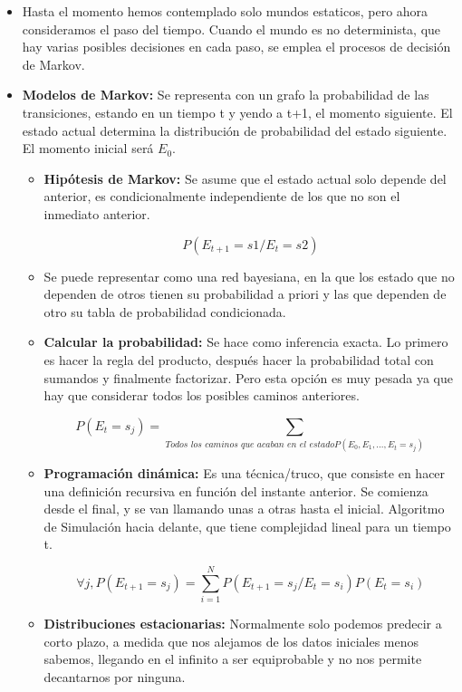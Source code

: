 \documentclass[12pt, twoside, openright]{report} %
\begin{document}
  
  \begin{itemize}
  \item Hasta el momento hemos contemplado solo mundos estaticos, pero ahora
    consideramos el paso del tiempo. Cuando el mundo es no determinista,
    que hay varias posibles decisiones en cada paso, se emplea el
    procesos de decisión de Markov.
    
  \item \textbf{Modelos de Markov:} Se representa con un grafo la
    probabilidad de las transiciones, estando en un tiempo t y yendo a
    t+1, el momento siguiente. El estado actual determina la
    distribución de probabilidad del estado siguiente. El momento
    inicial será $E_0$.
    

    \begin{itemize}
    \item \textbf{Hipótesis de Markov:} Se asume que el estado actual solo
      depende del anterior, es condicionalmente independiente de los que
      no son el inmediato anterior.

	  $$P(E_{t+1}=s1 / E_t =s2)$$
      
    \item Se puede representar como una red bayesiana, en la que los estado
      que no dependen de otros tienen su probabilidad a priori y las que
      dependen de otro su tabla de probabilidad condicionada.
      
    \item \textbf{Calcular la probabilidad:} Se hace como inferencia exacta.
      Lo primero es hacer la regla del producto, después hacer la
      probabilidad total con sumandos y finalmente factorizar. Pero esta
      opción es muy pesada ya que hay que considerar todos los posibles
      caminos anteriores.

	  $$P(E_t = s_j)= \sum\limits_{\textit{Todos los caminos que acaban en el estado} P(E_0, E_1, ..., E_t = s_j)}$$
      
    \item \textbf{Programación dinámica:} Es una técnica/truco, que consiste
      en hacer una definición recursiva en función del instante
      anterior. Se comienza desde el final, y se van llamando unas a
      otras hasta el inicial. Algoritmo de Simulación hacia delante, que
      tiene complejidad lineal para un tiempo t.

	  $$\forall j, P(E_{t+1}=s_j) = \sum\limits^N_{i=1} P(E_{t+1}=s_j/E_t=s_i)P(E_t = s_i)$$
      
    \item \textbf{Distribuciones estacionarias:} Normalmente solo podemos
      predecir a corto plazo, a medida que nos alejamos de los datos
      iniciales menos sabemos, llegando en el infinito a ser
      equiprobable y no nos permite decantarnos por ninguna.
      


\end{itemize}
\end{itemize}
\end{document}
